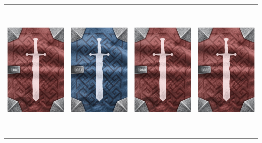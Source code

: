 \documentclass{minimal}
\begin{document}
{\begin{longtable}{llll}
\includegraphics[width=44mm,height=68mm]{./64-151/gh-081b-brilliant-blade-back.png} &
\includegraphics[width=44mm,height=68mm]{./64-151/gh-081a-brilliant-blade-back.png} &
\includegraphics[width=44mm,height=68mm]{./64-151/gh-080b-tremor-blade-back.png} &
\includegraphics[width=44mm,height=68mm]{./64-151/gh-080b-tremor-blade-back.png}\\ 

\end{longtable}}
\end{document}
